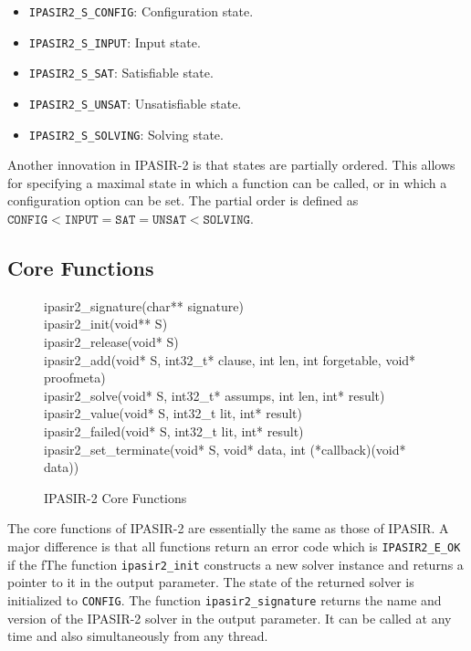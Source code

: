 \documentclass[sat]{iosart2x}
\begin{document}
\begin{itemize}
    \item \texttt{IPASIR2\_S\_CONFIG}: Configuration state.
    \item \texttt{IPASIR2\_S\_INPUT}: Input state.
    \item \texttt{IPASIR2\_S\_SAT}: Satisfiable state.
    \item \texttt{IPASIR2\_S\_UNSAT}: Unsatisfiable state.
    \item \texttt{IPASIR2\_S\_SOLVING}: Solving state.
\end{itemize}

Another innovation in IPASIR-2 is that states are partially ordered.
This allows for specifying a maximal state in which a function can be called, or in which a configuration option can be set.
The partial order is defined as $\mathtt{CONFIG < INPUT = SAT = UNSAT < SOLVING}$.

\subsection{Core Functions}

\begin{figure}[h]
    \tt\raggedright
    ipasir2\_signature(char** signature)\\[1ex]
    ipasir2\_init(void** S)\\
    ipasir2\_release(void* S)\\[1ex]
    ipasir2\_add(void* S, int32\_t* clause, int len, int forgetable, void* proofmeta)\\
    ipasir2\_solve(void* S, int32\_t* assumps, int len, int* result)\\
    ipasir2\_value(void* S, int32\_t lit, int* result)\\
    ipasir2\_failed(void* S, int32\_t lit, int* result)\\[1ex]
    ipasir2\_set\_terminate(void* S, void* data, int (*callback)(void* data))
    \caption{IPASIR-2 Core Functions}
\end{figure}

The core functions of IPASIR-2 are essentially the same as those of IPASIR.
A major difference is that all functions return an error code which is \texttt{IPASIR2\_E\_OK} if the fThe function \texttt{ipasir2\_init} constructs a new solver instance and returns a pointer to it in the output parameter.
The state of the returned solver is initialized to \texttt{CONFIG}.
The function \texttt{ipasir2\_signature} returns the name and version of the IPASIR-2 solver in the output parameter.
It can be called at any time and also simultaneously from any thread.
\end{document}
